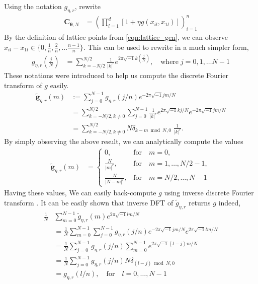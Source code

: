 \documentclass{iitthesis}          %
\newcommand{\bm}[1]{\boldsymbol{#1}}
\newcommand{\vtheta}{{\bm{\theta}}}
\newcommand{\vC}{\bm{C}}
\newcommand{\vg}{\bm{g}}
\def\abs#1{\ensuremath{\left \lvert #1 \right \rvert}}
\begin{document}
Using the notation $g_{\eta, r}$, rewrite
\begin{align*}
\vC_{\vtheta, N}
&= \left( \prod_{l=1}^d \left[ 1 + \eta g(x_{il}, x_{1l})\right] \right)_{i=1}^n
\end{align*}
By the definition of lattice points from \eqref{eqn:lattice_gen}, we can observe
$x_{il}-x_{1l} \in \lbrace 0, \frac 1n, \frac 2n, \dots \frac{n-1}{n}  \rbrace$. This can be used to rewrite in a much simpler form,
\begin{align*}
g_{\eta, r} \left(\frac jN \right) &= \sum_{k = - N/2 }^{N/2} \frac{1}{\abs{k}^r} 
e^{ 2 \pi\sqrt{-1} k (\frac jN)}, \quad \text{where} \;  j=0,1,\dots N-1
\end{align*}
These notations were introduced to help us compute the discrete Fourier transform of $g$ easily. 
\begin{align*}
\widetilde{\vg}_{\eta,r}(m) &:= \sum_{j=0}^{N-1} g_{\eta,r} (j/n) e^{- 2 \pi\sqrt{-1} jm/N} \\
&= \sum_{k = - N/2, k \neq 0 }^{N/2} 
\sum_{j=0}^{N-1} \frac{1}{\abs{k}^r} 
e^{ 2 \pi\sqrt{-1} k  j/N} e^{- 2 \pi\sqrt{-1} jm/N} \\
&= \sum_{k = - N/2, k \neq 0  }^{N/2} N \delta_{k-m \bmod N, 0} \; \frac{1}{\abs{k}^r}.
\end{align*}
By simply observing the above result, we can analytically compute the values
\begin{align} \label{dft_of_g}
\widetilde{\vg}_{\eta,r}(m) &= 
\begin{cases}
0, & \text{for} \quad m=0,\\
\frac{N}{\abs{m}^r}, & \text{for} \quad m=1,\dots,N/2-1, \\
\frac{N}{\abs{N-m}^r}, & \text{for} \quad m=N/2,\dots,N-1
\end{cases}
\end{align}
Having these values, We can easily back-compute $g$ using inverse discrete Fourier transform . It can be easily shown that inverse DFT of $\widetilde{g}_{\eta,r}$ returns $g$ indeed,
\begin{align*}
\frac{1}{N} &\sum_{m=0}^{N-1} \widetilde{g}_{\eta,r} (m) e^{2 \pi\sqrt{-1} lm/N} \\
& = \frac{1}{N} \sum_{m=0}^{N-1} 
\sum_{j=0}^{N-1} g_{\eta,r} (j/n) e^{- 2 \pi\sqrt{-1} jm/N}
e^{2 \pi\sqrt{-1} lm/N} \\
& = \frac{1}{N}  
\sum_{j=0}^{N-1} g_{\eta,r} (j/n) \sum_{m=0}^{N-1} e^{2 \pi\sqrt{-1} (l-j)m/N} \\
& = \frac{1}{N}  \sum_{j=0}^{N-1} g_{\eta,r} (j/n) N \delta_{(l-j) \bmod N, 0} \\
& = g_{\eta,r} (l/n), \quad \text{for} \quad l=0,\dots,N-1
\end{align*}
\end{document}
